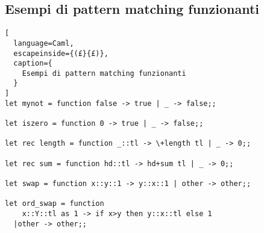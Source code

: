 \subsection{Esempi di pattern matching funzionanti}
\begin{lstlisting}[
  language=Caml,
  escapeinside={(£}{£)},
  caption={
    Esempi di pattern matching funzionanti
  }
]
let mynot = function false -> true | _ -> false;;

let iszero = function 0 -> true | _ -> false;;

let rec length = function _::tl -> \+length tl | _ -> 0;;

let rec sum = function hd::tl -> hd+sum tl | _ -> 0;;

let swap = function x::y::1 -> y::x::1 | other -> other;;

let ord_swap = function
    x::Y::tl as 1 -> if x>y then y::x::tl else 1
  |other -> other;;
\end{lstlisting}

